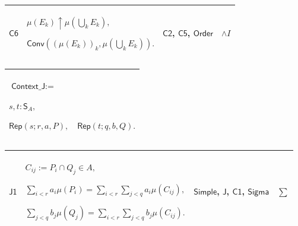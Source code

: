 \documentclass[11pt]{amsart}
\newlength{\FTCOneColumnBody}
\newlength{\FTCFourColumnBody}
\begin{document}
{\begin{tabular}
\end{tabular}%
\par\setlength{\parskip}{0pt}\nointerlineskip
\noindent
\begin{tabular}{|@{}>{\centering\arraybackslash}m{0.078431\FTCFourColumnBody}|>{\centering\arraybackslash}m{0.535947\FTCFourColumnBody}|>{\centering\arraybackslash}m{0.281045\FTCFourColumnBody}|>{\centering\arraybackslash}m{0.104575\FTCFourColumnBody}|}\hline
\hypertarget{proof:C6}{$\displaystyle \textsf{C6}$} & $\displaystyle \mu(E_k)\uparrow\mu(\bigcup_kE_k),$\par
$\displaystyle \textsf{Conv}((\mu(E_k))_k,\mu(\bigcup_kE_k)).$ & \hyperlink{proof:C2}{$\displaystyle \textsf{C2}$}, \hyperlink{proof:C5}{$\displaystyle \textsf{C5}$}, \hyperlink{lem:Order}{$\displaystyle \textsf{Order}$} & $\displaystyle \land I$\\ \hline
\end{tabular}%
\par\setlength{\parskip}{0pt}\nointerlineskip
\noindent
\begin{tabular}{|@{}>{\centering\arraybackslash}m{\FTCOneColumnBody}|}\hline
$\displaystyle \textsf{Context\_J}:=$\par
$\displaystyle s,t:\textsf{S}_A,$\par
$\displaystyle \textsf{Rep}(s;r,a,P),\quad\textsf{Rep}(t;q,b,Q).$\\ \hline
\end{tabular}%
\par\setlength{\parskip}{0pt}\nointerlineskip
\noindent
\begin{tabular}{|@{}>{\centering\arraybackslash}m{0.078431\FTCFourColumnBody}|>{\centering\arraybackslash}m{0.535947\FTCFourColumnBody}|>{\centering\arraybackslash}m{0.281045\FTCFourColumnBody}|>{\centering\arraybackslash}m{0.104575\FTCFourColumnBody}|}\hline
\hypertarget{proof:J1}{$\displaystyle \textsf{J1}$} & $\displaystyle C_{ij}:=P_i\cap Q_j\in A,$\par
$\displaystyle \sum_{i<r}a_i\mu(P_i)=\sum_{i<r}\sum_{j<q}a_i\mu(C_{ij}),$\par
$\displaystyle \sum_{j<q}b_j\mu(Q_j)=\sum_{i<r}\sum_{j<q}b_j\mu(C_{ij}).$ & \hyperlink{def:Simple}{$\displaystyle \textsf{Simple}$}, \hyperlink{def:J}{$\displaystyle \textsf{J}$}, \hyperlink{proof:C1}{$\displaystyle \textsf{C1}$}, \hyperlink{ax:Sigma}{$\displaystyle \textsf{Sigma}$} & $\displaystyle \sum$\\ \hline
\end{tabular}%
\par\setlength{\parskip}{0pt}\nointerlineskip
}
\end{document}
